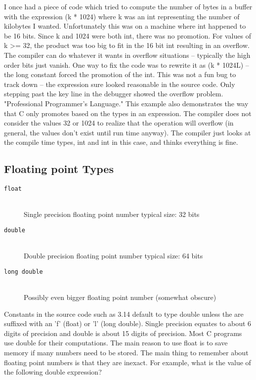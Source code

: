 I once had a piece of code which tried to compute the number of bytes in a buffer with the expression (k * 1024) where k was an int representing the number of kilobytes I wanted. Unfortunately this was on a machine where int happened to be 16 bits. Since k and 1024 were both int, there was no promotion. For values of k >= 32, the product was too big to fit in the 16 bit int resulting in an overflow. The compiler can do whatever it wants in overflow situations -- typically the high order bits just vanish. One way to fix the code was to rewrite it as (k * 1024L) -- the long constant forced the promotion of the int. This was not a fun bug to track down -- the expression sure looked reasonable in the source code. Only stepping past the key line in the debugger showed the overflow problem. "Professional Programmer's Language." This example also demonstrates the way that C only promotes based on the types in an expression. The compiler does not consider the values 32 or 1024 to realize that the operation will overflow (in general, the values don't exist until run time anyway). The compiler just looks at the compile time types, int and int in this case, and thinks everything is fine.

\subsection{Floating point Types}

\begin{description}
\item[\lstinline{float}] \hfill \\
    Single precision floating point number typical size: 32 bits 
\item[\lstinline{double}] \hfill \\
    Double precision floating point number typical size: 64 bits
\item[\lstinline{long double}] \hfill \\
    Possibly even bigger floating point number (somewhat obscure)
\end{description}

Constants in the source code such as 3.14 default to type double unless the are suffixed with an 'f' (float) or 'l' (long double). Single precision equates to about 6 digits of precision and double is about 15 digits of precision. Most C programs use double for their computations. The main reason to use float is to save memory if many numbers need to be stored. The main thing to remember about floating point numbers is that they are inexact. For example, what is the value of the following double expression?

